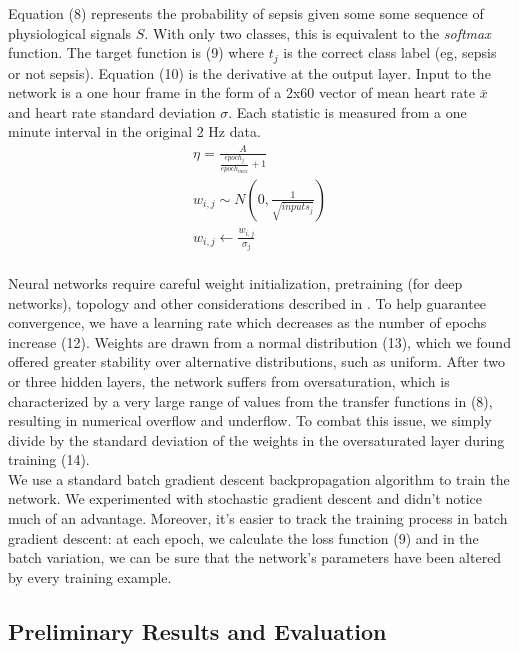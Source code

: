 \documentclass[12pt,solutions]{article}
\begin{document}
Equation (8) represents the probability
of sepsis given some some sequence of physiological signals $S$. With only two classes, this is equivalent to the
\textit{softmax} function. The 
target function is (9) where $t_{j}$ is the correct class label (eg, sepsis or not sepsis). Equation (10)
is the derivative at the output layer. Input to the network is a one hour frame in the form of a 2x60 vector of mean heart rate $\bar{x}$
and heart rate standard deviation $\sigma$. Each statistic is measured from a one minute interval in the original 2 Hz data.
\begin{align}
\eta = \frac{A}{\frac{epoch_{j}}{epoch_{max}} + 1} \\
w_{i,j} \sim N(0, \frac{1}{\sqrt{inputs_{j}}}) \\
w_{i,j} \leftarrow \frac{w_{i,j}}{\sigma_{j}}
\end{align}
\\
Neural networks require careful weight initialization, pretraining (for deep networks), topology and other considerations described in \cite{vesely2013sequence, hinton2012deep}. To help guarantee convergence, we have a learning rate which decreases as the number of epochs increase (12). Weights are drawn from a normal distribution (13), which we found offered greater stability over alternative distributions, such as uniform. After two or three hidden layers, the network suffers from oversaturation, which is characterized by a very large range of values from the
transfer functions in (8), resulting in numerical overflow and underflow. To combat this issue, we simply divide by the standard deviation
of the weights in the oversaturated layer during training (14).
\\
We use a standard batch gradient descent backpropagation algorithm to train the network. We experimented with stochastic gradient descent and didn't
notice much of an advantage. Moreover, it's easier to track the training process in batch gradient descent: at each epoch, we calculate
the loss function (9) and in the batch variation, we can be sure that the network's parameters have been altered by every training example.

\subsection{Preliminary Results and Evaluation}
\end{document}
